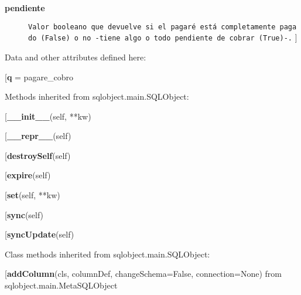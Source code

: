\begin{description}\item[{\bf pendiente}
]{\tt Valor~booleano~que~devuelve~si~el~pagaré~está~completamente~pagado~(False)~o~no~-tiene~algo~o~todo~pendiente~de~cobrar~(True)-.}
]\begin{description}\item[{\bf {\it get}} = esta\_pendiente(self)\end{description}

\end{description}

Data and other attributes defined here:\\
\begin{description}\item[{\bf q} = pagare\_cobro\end{description}


Methods inherited from sqlobject.main.SQLObject:\\
\begin{description}\item[{\bf \_\_init\_\_}(self, **kw)\end{description}

\begin{description}\item[{\bf \_\_repr\_\_}(self)\end{description}

\begin{description}\item[{\bf destroySelf}(self)\end{description}

\begin{description}\item[{\bf expire}(self)\end{description}

\begin{description}\item[{\bf set}(self, **kw)\end{description}

\begin{description}\item[{\bf sync}(self)\end{description}

\begin{description}\item[{\bf syncUpdate}(self)\end{description}


Class methods inherited from sqlobject.main.SQLObject:\\
\begin{description}\item[{\bf addColumn}(cls, columnDef, changeSchema=False, connection=None) from sqlobject.main.MetaSQLObject\end{description}

